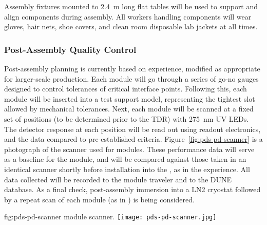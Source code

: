 Assembly fixtures mounted to \SI{2.4}{m} long flat tables will be used to support and align  components during assembly.  All workers handling  components will wear gloves, hair nets, shoe covers, and clean room disposable lab jackets at all times.

\subsubsection{Post-Assembly Quality Control}

Post-assembly  planning is currently based on  experience, modified as appropriate for larger-scale production.  Each module will go through a series of go-no gauges designed to control tolerances of critical interface points.  Following this, each module will be inserted into a test  support model, representing the tightest slot allowed by  mechanical tolerances. Next, each module will be scanned at a fixed set of positions (to be determined prior to the TDR) with \SI{275}{nm} UV LEDs.  The detector response at each position will be read out using  readout electronics, and the data compared to pre-established criteria.  Figure~\ref{fig:pds-pd-scanner} is a photograph of the scanner used for  modules. These performance data will serve as a baseline for the module, and will be compared against those taken in an identical scanner shortly before installation into the , as in the  experience.  All data collected will be recorded to the module traveler and to the DUNE  database.
As a final  check, post-assembly immersion into a LN2 cryostat followed by a repeat scan of each  module (as in ) is being considered.

\begin{dunefigure}{fig:pds-pd-scanner}
{ module scanner.}
  \texttt{[image: pds-pd-scanner.jpg]}
\end{dunefigure}



